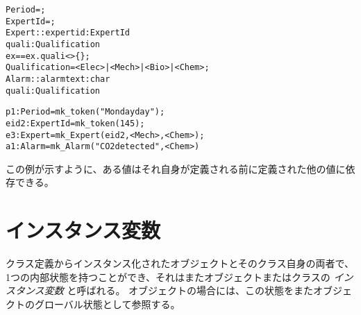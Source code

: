 \documentclass[\pformat,12pt]{jarticle}
\begin{document}
\begin{description}
\begin{alltt}
     Period = ;
     ExpertId = ;
     Expert :: expertid : ExpertId
               quali :  Qualification
      ex == ex.quali <> \{\};
     Qualification = <Elec> | <Mech> | <Bio> | <Chem>;
     Alarm :: alarmtext :  char
              quali : Qualification

 
     \PUBLIC p1: Period = mk_token("Monday day");
     \PRIVATE eid2 : ExpertId = mk_token(145);
     \PROTECTED e3 : Expert = mk_Expert(eid2, { <Mech>, <Chem> });
     \mbox{} a1 : Alarm = mk_Alarm("CO2 detected", <Chem>)
\end{alltt}
 この例が示すように、ある値はそれ自身が定義される前に定義された他の値に依存できる。
\end{description}

\section{インスタンス変数}
\label{sec:ivars}

クラス定義からインスタンス化されたオブジェクトとそのクラス自身の両者で、1つの内部状態を持つことができ、それはまたオブジェクトまたはクラスの \emph{インスタンス変数} と呼ばれる。 
オブジェクトの場合には、この状態をまたオブジェクトのグローバル状態として参照する。
\end{document}
